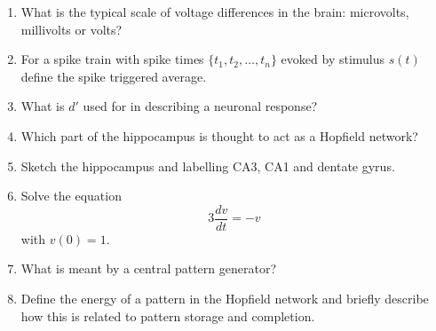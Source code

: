 \documentclass[a4paper,12pt]{article}
\newif\ifsoln
\begin{document}
\begin{enumerate}

\item What is the typical scale of voltage differences in the brain: microvolts, millivolts or volts?

\ifsoln Solution:  millivolts.\fi


\item For a spike train with spike times $\{t_1,t_2,\ldots,t_n\}$ evoked by stimulus $s(t)$ define the spike triggered average.

\ifsoln Solution:  $$S(\tau)=\frac{1}{n}\sum_i s(t_i-\tau)$$. \fi


\item What is $d'$ used for in describing a neuronal response?

\ifsoln Solution:  It measures the difference between two sets of multi-trial responses.\fi


\item Which part of the hippocampus is thought to act as a Hopfield network?

\ifsoln Solution:  CA3 \fi


\item Sketch the hippocampus and labelling CA3, CA1 and dentate gyrus.

\ifsoln Solution:  Should show two interlocking horseshoe shapes, the smaller is the dentate gyrus, the larger contains CA3 and CA1, CA3 is at the end that interlocks with the dentate gyrus. \fi


\item Solve the equation
$$3\frac{dv}{dt}=-v$$
with $v(0)=1$.

\ifsoln
Solved by ansatz or integrating factor this give $v=\exp{(-t/3)}$.
\fi


\item What is meant by a central pattern generator?  

\ifsoln Solution:  It is an intrinsically spiking network of neuron which creates
a rhythmic activity.\fi

\item Define the energy of a pattern in the Hopfield network and
  briefly describe how this is related to pattern storage and
  completion.

\ifsoln Solution: 
The energy is given by 
$$E=-\frac{1}{2}\sum_{ij}x_iw_{ij}x_j$$
and stored patterns correspond to local minima.
\fi

\end{enumerate}
\end{document}
